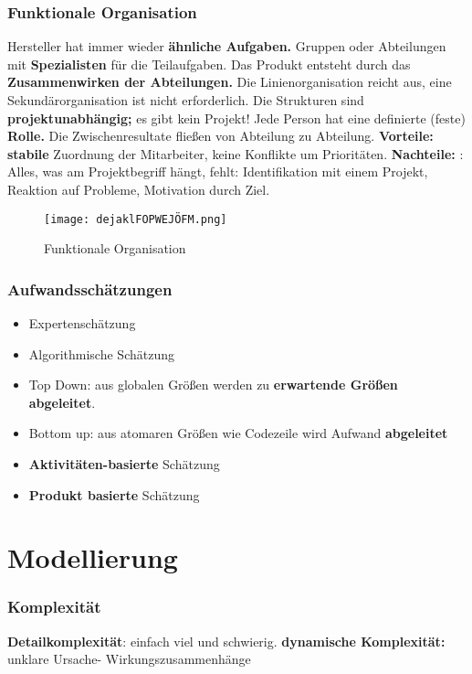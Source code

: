 \documentclass{book}
\begin{document}
    \subsection{\textbf{Funktionale Organisation}}
    Hersteller hat immer wieder \textbf{ähnliche Aufgaben.} Gruppen oder Abteilungen mit \textbf{Spezialisten} für die
    Teilaufgaben. Das Produkt entsteht durch das \textbf{Zusammenwirken der Abteilungen.}  \newline
    Die Linienorganisation reicht aus, eine Sekundärorganisation ist nicht erforderlich. Die Strukturen sind
    \textbf{projektunabhängig;} es gibt kein Projekt! Jede Person hat eine definierte (feste) \textbf{Rolle.}
    Die Zwischenresultate fließen von Abteilung zu Abteilung.
    \newline
    \newline \textbf{Vorteile: }\textbf{stabile} Zuordnung der Mitarbeiter, keine Konflikte um Prioritäten.
    \newline \textbf{Nachteile: }: Alles, was am Projektbegriff hängt, fehlt: Identifikation mit einem Projekt, Reaktion auf
    Probleme, Motivation durch Ziel.
    \begin{figure}[H]
        \centering
        \texttt{[image: dejaklFOPWEJÖFM.png]}
        \caption{Funktionale Organisation}
        \label{fig:enter-label}
    \end{figure}
    \subsection{Aufwandsschätzungen}
    \begin{itemize}
        \item Expertenschätzung
        \item Algorithmische Schätzung
        \item Top Down: aus globalen Größen werden zu \textbf{erwartende Größen abgeleitet}.
        \item Bottom up: aus atomaren Größen wie Codezeile wird Aufwand \textbf{abgeleitet}
        \item \textbf{Aktivitäten-basierte} Schätzung
        \item \textbf{Produkt basierte} Schätzung
    \end{itemize}
    \chapter {Modellierung}
    \subsection{Komplexität}
    \textbf{Detailkomplexität}: einfach viel und schwierig.
    \newline \textbf{dynamische Komplexität:} unklare Ursache- Wirkungszusammenhänge
\end{document}
